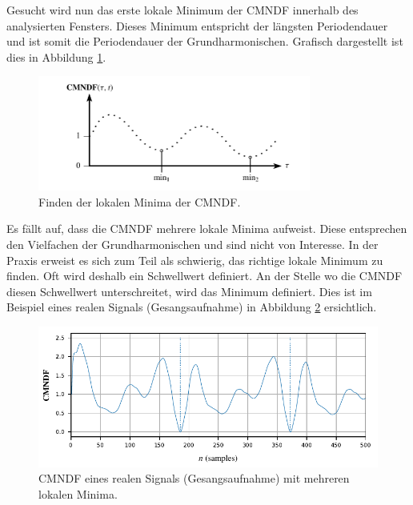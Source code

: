 Gesucht wird nun das erste lokale Minimum der CMNDF innerhalb des analysierten Fensters.
Dieses Minimum entspricht der längsten Periodendauer und ist somit die Periodendauer der Grundharmonischen.
Grafisch dargestellt ist dies in Abbildung \ref{autotune:fig:cmndfMinimum}.
\begin{figure}
	\centering
	\includegraphics[width=0.8\textwidth]{papers/autotune/images/CMNDF_Minimum.pdf}
	\caption{Finden der lokalen Minima der CMNDF.}
    \label{autotune:fig:cmndfMinimum}
\end{figure}

Es fällt auf, dass die CMNDF mehrere lokale Minima aufweist.
Diese entsprechen den Vielfachen der Grundharmonischen und sind nicht von Interesse.
In der Praxis erweist es sich zum Teil als schwierig, das richtige lokale Minimum zu finden.
Oft wird deshalb ein Schwellwert definiert.
An der Stelle wo die CMNDF diesen Schwellwert unterschreitet, wird das Minimum definiert.
Dies ist im Beispiel eines realen Signals (Gesangsaufnahme) in Abbildung \ref{autotune:fig:cmndfRealSignal} ersichtlich.
\begin{figure}
	\centering
	\includegraphics[width=\textwidth]{papers/autotune/images/Example-CMNDF.pdf}
	\caption{CMNDF eines realen Signals (Gesangsaufnahme) mit mehreren lokalen Minima.}
    \label{autotune:fig:cmndfRealSignal}
\end{figure}

